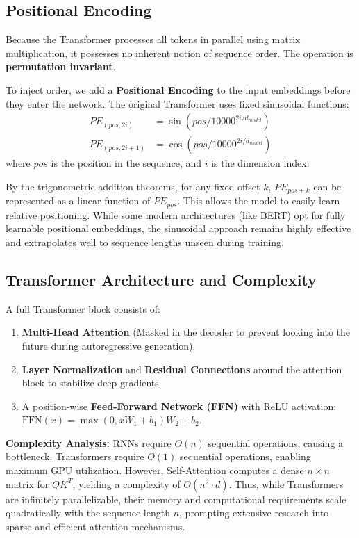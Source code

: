 \subsection{Positional Encoding}
Because the Transformer processes all tokens in parallel using matrix multiplication, it possesses no inherent notion of sequence order. The operation is \textbf{permutation invariant}.

To inject order, we add a \textbf{Positional Encoding} to the input embeddings before they enter the network. The original Transformer uses fixed sinusoidal functions:
\begin{align}
    PE_{(pos, 2i)} &= \sin(pos / 10000^{2i/d_{model}}) \\
    PE_{(pos, 2i+1)} &= \cos(pos / 10000^{2i/d_{model}})
\end{align}
where $pos$ is the position in the sequence, and $i$ is the dimension index. 

By the trigonometric addition theorems, for any fixed offset $k$, $PE_{pos+k}$ can be represented as a linear function of $PE_{pos}$. This allows the model to easily learn relative positioning. While some modern architectures (like BERT) opt for fully learnable positional embeddings, the sinusoidal approach remains highly effective and extrapolates well to sequence lengths unseen during training.

\subsection{Transformer Architecture and Complexity}
A full Transformer block consists of:
\begin{enumerate}
    \item \textbf{Multi-Head Attention} (Masked in the decoder to prevent looking into the future during autoregressive generation).
    \item \textbf{Layer Normalization} and \textbf{Residual Connections} around the attention block to stabilize deep gradients.
    \item A position-wise \textbf{Feed-Forward Network (FFN)} with ReLU activation: $\text{FFN}(x) = \max(0, xW_1 + b_1)W_2 + b_2$.
\end{enumerate}

\textbf{Complexity Analysis:}
RNNs require $O(n)$ sequential operations, causing a bottleneck. Transformers require $O(1)$ sequential operations, enabling maximum GPU utilization. However, Self-Attention computes a dense $n \times n$ matrix for $Q K^T$, yielding a complexity of $O(n^2 \cdot d)$. Thus, while Transformers are infinitely parallelizable, their memory and computational requirements scale quadratically with the sequence length $n$, prompting extensive research into sparse and efficient attention mechanisms.

